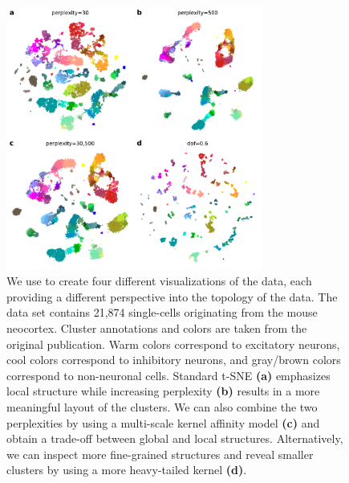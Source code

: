 \documentclass[article]{jss}
\newcommand{\opentsne}{\pkg{openTSNE}\xspace}
\begin{document}
\begin{figure}[htbp]
  \center
  \includegraphics[width=0.75\textwidth]{tasic2018}
  \caption{\label{fig:tasic}
  We use \opentsne to create four different
  visualizations of the \citet{tasic2018shared} data,
  each providing a different perspective into the topology of the data.
  The data set contains 21,874 single-cells originating from the mouse
  neocortex. Cluster annotations and colors are taken from the original
  publication. Warm colors correspond to excitatory neurons, cool colors
  correspond to inhibitory neurons, and gray/brown colors correspond to
  non-neuronal cells. Standard t-SNE \textbf{(a)} emphasizes local
  structure while increasing perplexity \textbf{(b)} results in a more
  meaningful layout of the clusters. We can also combine the two
  perplexities by using a multi-scale kernel affinity model \textbf{(c)}
  and obtain a trade-off between global and local structures.
  Alternatively, we can inspect more fine-grained structures and reveal
  smaller clusters by using a more heavy-tailed kernel \textbf{(d)}.}
\end{figure}
\end{document}
